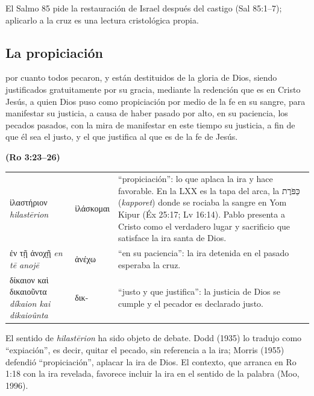 \documentclass[11pt,letterpaper]{article}
\newcommand{\heb}[1]{\mbox{\foreignlanguage{hebrew}{#1}}}
\newcommand{\grc}[1]{\foreignlanguage{ancientgreek}{#1}}
\newcommand{\fuente}[1]{\par\hfill{\upshape\bfseries\small\textcolor{azul}{#1}}}
\begin{document}
\begin{nota}[Precisión]
El Salmo 85 pide la restauración de Israel después del castigo (Sal 85:1--7); aplicarlo a la cruz es una lectura cristológica propia.
\end{nota}

\subsection{La propiciación}
\begin{cita}por cuanto todos pecaron, y están destituidos de la gloria de Dios, siendo justificados gratuitamente por su gracia, mediante la redención que es en Cristo Jesús, a quien Dios puso como propiciación por medio de la fe en su sangre, para manifestar su justicia, a causa de haber pasado por alto, en su paciencia, los pecados pasados, con la mira de manifestar en este tiempo su justicia, a fin de que él sea el justo, y el que justifica al que es de la fe de Jesús.\fuente{(Ro 3:23--26)}\end{cita}

\begin{filologia}[Ro 3:25]
\begin{tabular}{@{}L{3.2cm}L{1.6cm}L{10cm}@{}}
\grc{ἱλαστήριον} \emph{hilastērion} & \grc{ἱλάσκομαι} & ``propiciación'': lo que aplaca la ira y hace favorable. En la LXX es la tapa del arca, la \heb{כַּפֹּרֶת} (\emph{kapporet}) donde se rociaba la sangre en Yom Kipur (Éx 25:17; Lv 16:14). Pablo presenta a Cristo como el verdadero lugar y sacrificio que satisface la ira santa de Dios. \\[2pt]
\grc{ἐν τῇ ἀνοχῇ} \emph{en tē anojē} & \grc{ἀνέχω} & ``en su paciencia'': la ira detenida en el pasado esperaba la cruz. \\[2pt]
\grc{δίκαιον καὶ δικαιοῦντα} \emph{díkaion kai dikaioûnta} & \grc{δικ-} & ``justo y que justifica'': la justicia de Dios se cumple y el pecador es declarado justo. \\
\end{tabular}
\end{filologia}

\begin{nota}[Precisión]
El sentido de \emph{hilastērion} ha sido objeto de debate. Dodd (1935) lo tradujo como ``expiación'', es decir, quitar el pecado, sin referencia a la ira; Morris (1955) defendió ``propiciación'', aplacar la ira de Dios. El contexto, que arranca en Ro 1:18 con la ira revelada, favorece incluir la ira en el sentido de la palabra (Moo, 1996).
\end{nota}
\end{document}
